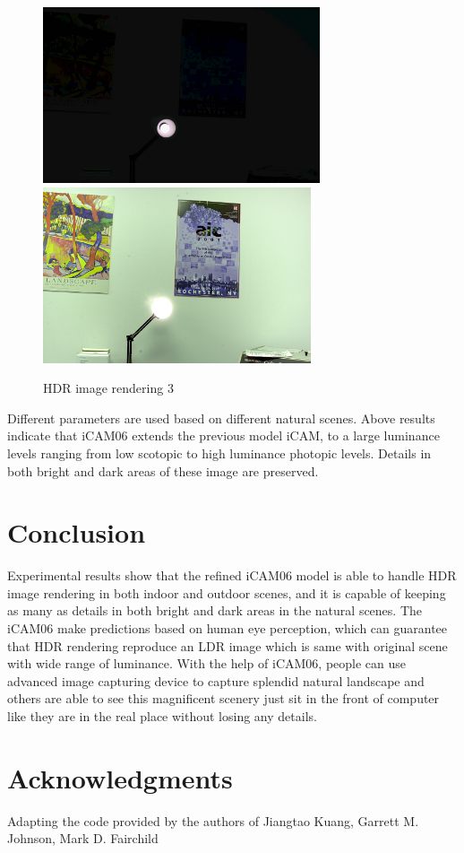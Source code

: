 \documentclass[10pt,twocolumn,letterpaper]{article}
\begin{document}
\begin{figure}[H]
\begin{center}
\includegraphics[height=14em]{images/wall_original.jpg}
\includegraphics[height=14em]{images/wall_processed.jpg}
\end{center}
\caption{HDR image rendering 3}
\label{example2}
\end{figure}

Different parameters are used based on different natural scenes. Above results indicate that iCAM06 extends the previous model iCAM, to a large luminance levels ranging from low scotopic to high luminance photopic levels. Details in both bright and dark areas of these image are preserved.

\section{Conclusion}
Experimental results show that the refined iCAM06 model is able to handle HDR image rendering in both indoor and outdoor scenes, and it is capable of keeping as many as details in both bright and dark areas in the natural scenes. The iCAM06 make predictions based on human eye perception, which can guarantee that HDR rendering reproduce an LDR image which is same with original scene with wide range of luminance. With the help of iCAM06, people can use advanced image capturing device to capture splendid natural landscape and others are able to see this magnificent scenery just sit in the front of computer like they are in the real place without losing any details. 
\section*{Acknowledgments}
Adapting the code provided by the authors of Jiangtao Kuang, Garrett M. Johnson, Mark D. Fairchild

{
\small


}
\end{document}
